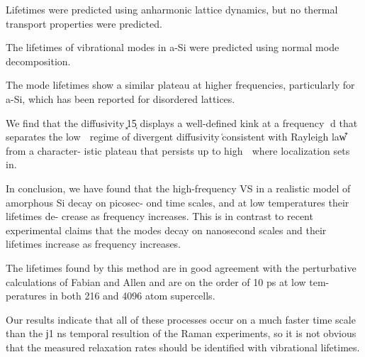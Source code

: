 \documentclass[aps,prb,twocolumn,superscriptaddress,footinbib,amsmath,amssymb,floatfix]{revtex4}
\begin{document}
Lifetimes were predicted using anharmonic lattice dynamics, but no thermal 
transport properties were predicted.\cite{fabian_anharmonic_1996}

The lifetimes of vibrational modes in a-Si were predicted using normal 
mode decomposition.\cite{he_heat_2011}



The mode lifetimes show a similar 
plateau at higher frequencies, particularly for a-Si, which has been 
reported for disordered lattices.\cite{larkin_predicting_2013}

We
find that the diffusivity ͓15͔ displays a well-defined kink at a
frequency ␻d that separates the low ␻ regime of divergent
diffusivity ͑consistent with Rayleigh law͒ from a character-
istic plateau that persists up to high ␻ where localization sets
in.\cite{vitelli_heat_2010}

In conclusion, we have found that the high-frequency
VS in a realistic model of amorphous Si decay on picosec-
ond time scales, and at low temperatures their lifetimes de-
crease as frequency increases. This is in contrast to recent
experimental claims that the modes decay on nanosecond
scales and their lifetimes increase as frequency increases.
\cite{fabian_anharmonic_1996} 

The lifetimes found by this method
are in good agreement with the perturbative calculations of
Fabian and Allen and are on the order of 10 ps at low tem-
peratures in both 216 and 4096 atom supercells.
\cite{bickham_calculation_1998}

Our results indicate that all of
these processes occur on a much faster time scale than the
ϳ1 ns temporal resultion of the Raman experiments, so it is
not obvious that the measured relaxation rates should be
identified with vibrational lifetimes.
\cite{bickham_numerical_1999}
\end{document}

